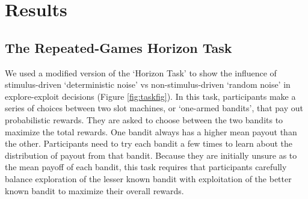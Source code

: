 \documentclass[12pt]{article}
\begin{document}
{	\section*{Results}	
	\subsection*{The Repeated-Games Horizon Task}
	We used a modified version of the `Horizon Task' \citep{wilson2014} to show the influence of stimulus-driven `deterministic noise' vs non-stimulus-driven `random noise' in explore-exploit decisions (Figure \ref{fig:taskfig}). In this task, participants make a series of choices between two slot machines, or `one-armed bandits', that pay out probabilistic rewards. They are asked to choose between the two bandits to maximize the total rewards. One bandit always has a higher mean payout than the other. Participants need to try each bandit a few times to learn about the distribution of payout from that bandit. Because they are initially unsure as to the mean payoff of each bandit, this task requires that participants carefully balance exploration of the lesser known bandit with exploitation of the better known bandit to maximize their overall rewards. 
	
}
\end{document}
